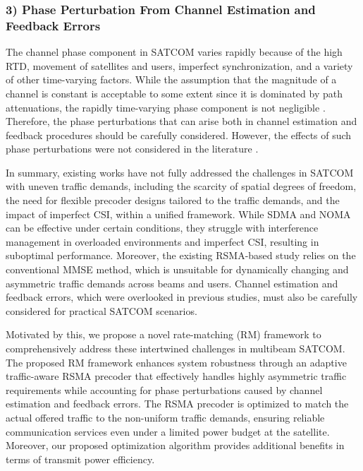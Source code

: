 \documentclass[draftclsnofoot, onecolumn, comsoc, 12pt]{IEEEtran}
\begin{document}
{%

\subsubsection*{\rm{3) Phase Perturbation From Channel Estimation and Feedback Errors}}
The channel phase component in SATCOM varies rapidly because of the high RTD, movement of satellites and users, imperfect synchronization, and a variety of other time-varying factors. 
While the assumption that the magnitude of a channel is constant is acceptable to some extent since it is dominated by path attenuations, the rapidly time-varying phase component is not negligible \cite{vazquez2016precoding, gharanjik2015robust, zhang2019robust, wang2021resource}.
Therefore, the phase perturbations that can arise both in channel estimation and feedback procedures should be carefully considered. However, the effects of such phase perturbations were not considered in the literature \cite{wang2020noma, lin2022multi, zheng2012generic, liu2019qos, 9769901, cui2023energy}.

In summary, existing works \cite{wang2020noma, lin2022multi, zheng2012generic, liu2019qos, 9769901, cui2023energy} have not fully addressed the challenges in SATCOM with uneven traffic demands, including the scarcity of spatial degrees of freedom, the need for flexible precoder designs tailored to the traffic demands, and the impact of imperfect CSI, within a unified framework. While SDMA and NOMA can be effective under certain conditions, they struggle with interference management in overloaded environments and imperfect CSI, resulting in suboptimal performance. Moreover, the existing RSMA-based study relies on the conventional MMSE method, which is unsuitable for dynamically changing and asymmetric traffic demands across beams and users. Channel estimation and feedback errors, which were overlooked in previous studies, must also be carefully considered for practical SATCOM scenarios.



Motivated by this, we propose a novel rate-matching (RM) framework to comprehensively address these intertwined challenges in multibeam SATCOM. 
The proposed RM framework enhances system robustness through an adaptive traffic-aware RSMA precoder that effectively handles highly asymmetric traffic requirements while accounting for phase perturbations caused by channel estimation and feedback errors. The RSMA precoder is optimized to match the actual offered traffic to the non-uniform traffic demands, ensuring reliable communication services even under a limited power budget at the satellite. Moreover, our proposed optimization algorithm provides additional benefits in terms of transmit power efficiency.


}
\end{document}
